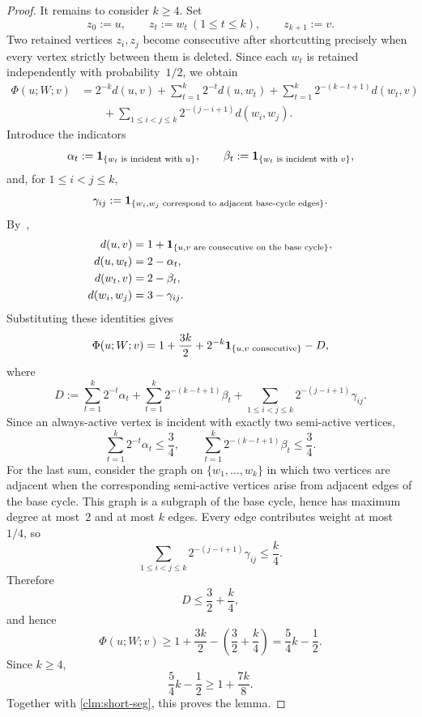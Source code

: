 \documentclass[12pt,a4paper,oneside]{report}
\begin{document}
\begin{proof}
It remains to consider $k\ge4$.  Set
\[
    z_0:=u,\qquad
    z_t:=w_t\ (1\le t\le k),\qquad
    z_{k+1}:=v.
\]
Two retained vertices $z_i,z_j$ become consecutive after shortcutting
precisely when every vertex strictly between them is deleted.  Since each
$w_t$ is retained independently with probability~$1/2$, we obtain
\begin{align*}
    \Phi(u;W;v)
    &=
    2^{-k}d(u,v)
    +\sum_{t=1}^k2^{-t}d(u,w_t)
    +\sum_{t=1}^k2^{-(k-t+1)}d(w_t,v)\\
    &\qquad
    +\sum_{1\le i<j\le k}2^{-(j-i+1)}d(w_i,w_j).
\end{align*}
Introduce the indicators
\[
    \alpha_t:=\mathbf{1}_{\{w_t\text{ is incident with }u\}},
    \qquad
    \beta_t:=\mathbf{1}_{\{w_t\text{ is incident with }v\}},
\]
and, for $1\le i<j\le k$,
\[
    \gamma_{ij}
    :=
    \mathbf{1}_{\{w_i,w_j\text{ correspond to adjacent base-cycle edges}\}}.
\]
By~,
\begin{align*}
    d(u,v)
    &=1+\mathbf{1}_{\{u,v\text{ are consecutive on the base cycle}\}},\\
    d(u,w_t)&=2-\alpha_t,\\
    d(w_t,v)&=2-\beta_t,\\
    d(w_i,w_j)&=3-\gamma_{ij}.
\end{align*}
Substituting these identities gives
\[
    \Phi(u;W;v)
    =
    1+\frac{3k}{2}
    +2^{-k}\mathbf{1}_{\{u,v\text{ consecutive}\}}
    -D,
\]
where
\[
    D
    :=
    \sum_{t=1}^k2^{-t}\alpha_t
    +\sum_{t=1}^k2^{-(k-t+1)}\beta_t
    +\sum_{1\le i<j\le k}2^{-(j-i+1)}\gamma_{ij}.
\]
Since an always-active vertex is incident with exactly two semi-active vertices,
\[
    \sum_{t=1}^k2^{-t}\alpha_t
    \le\frac34,
    \qquad
    \sum_{t=1}^k2^{-(k-t+1)}\beta_t
    \le\frac34.
\]
For the last sum, consider the graph on
$\{w_1,\dots,w_k\}$ in which two vertices are adjacent when the
corresponding semi-active vertices arise from adjacent edges of the base
cycle.  This graph is a subgraph of the base cycle, hence has maximum degree at
most~$2$ and at most $k$ edges.  Every edge contributes weight at
most~$1/4$, so
\[
    \sum_{1\le i<j\le k}
    2^{-(j-i+1)}\gamma_{ij}
    \le\frac{k}{4}.
\]
Therefore
\[
    D\le\frac32+\frac{k}{4},
\]
and hence
\[
    \Phi(u;W;v)
    \ge
    1+\frac{3k}{2}
    -\left(\frac32+\frac{k}{4}\right)
    =
    \frac54k-\frac12.
\]
Since $k\ge4$,
\[
    \frac54k-\frac12
    \ge1+\frac{7k}{8}.
\]
Together with \cref{clm:short-seg}, this proves the lemma.
\end{proof}
\end{document}
